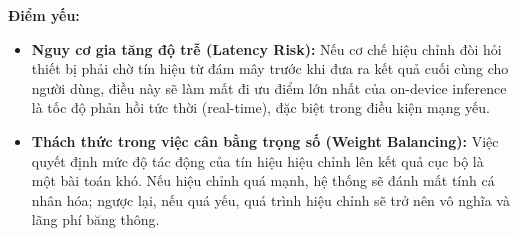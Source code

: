 \textbf{Điểm yếu:}
\begin{itemize}
    \item \textbf{Nguy cơ gia tăng độ trễ (Latency Risk):} Nếu cơ chế hiệu chỉnh đòi hỏi thiết bị phải chờ tín hiệu từ đám mây trước khi đưa ra kết quả cuối cùng cho người dùng, điều này sẽ làm mất đi ưu điểm lớn nhất của on-device inference là tốc độ phản hồi tức thời (real-time), đặc biệt trong điều kiện mạng yếu.
    \item \textbf{Thách thức trong việc cân bằng trọng số (Weight Balancing):} Việc quyết định mức độ tác động của tín hiệu hiệu chỉnh lên kết quả cục bộ là một bài toán khó. Nếu hiệu chỉnh quá mạnh, hệ thống sẽ đánh mất tính cá nhân hóa; ngược lại, nếu quá yếu, quá trình hiệu chỉnh sẽ trở nên vô nghĩa và lãng phí băng thông.
\end{itemize}
